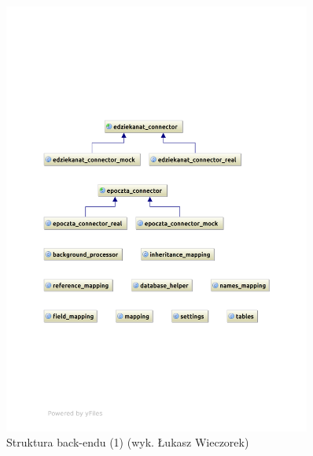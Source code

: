 \begin{figure}[H]
\begin{center}
\includegraphics[width=0.9\textwidth]{figures/lw/backend1.pdf} 
\end{center}
\caption{Struktura back-endu (1) (wyk. Łukasz Wieczorek)}\label{rys:back-end1}
\end{figure}
\newpage

